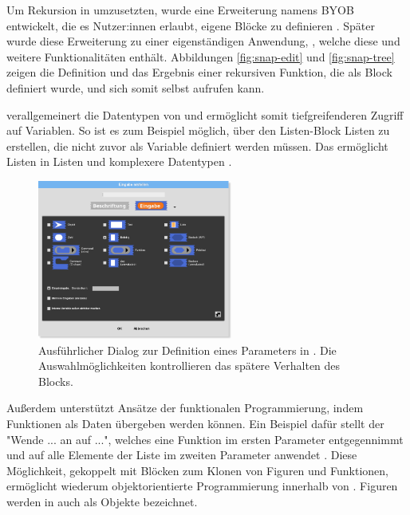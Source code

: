 Um Rekursion in \Scratch{} umzusetzten, wurde eine Erweiterung namens \ac{BYOB} entwickelt, die es Nutzer:innen erlaubt, eigene Blöcke zu definieren \parencite{harveyBringingNo2010}. Später wurde diese Erweiterung zu einer eigenständigen Anwendung, \Snap{}, welche diese und weitere Funktionalitäten enthält. Abbildungen \ref{fig:snap-edit} und \ref{fig:snap-tree} zeigen die Definition und das Ergebnis einer rekursiven Funktion, die als Block definiert wurde, und sich somit selbst aufrufen kann.

\Snap{} verallgemeinert die Datentypen von \Scratch{} und ermöglicht somit tiefgreifenderen Zugriff auf Variablen. So ist es zum Beispiel möglich, über den Listen-Block Listen zu erstellen, die nicht zuvor als Variable definiert werden müssen. Das ermöglicht Listen in Listen und komplexere Datentypen \parencite{harveySnapReference2020}.

\begin{figure}
  \centering
  \includegraphics[width=0.57\textwidth]{assets/snap-input-types.png}
  \caption[Dialog zur Definition eines Parameters in \Snap{}]{Ausführlicher Dialog zur Definition eines Parameters in \Snap{}. Die Auswahlmöglichkeiten kontrollieren das spätere Verhalten des Blocks.}
  \label{fig:snap-input-types}
\end{figure}

Außerdem unterstützt \Snap{} Ansätze der funktionalen Programmierung, indem Funktionen als Daten übergeben werden können. Ein Beispiel dafür stellt der "Wende ... an auf ...", welches eine Funktion im ersten Parameter entgegennimmt und auf alle Elemente der Liste im zweiten Parameter anwendet \parencite{harveySnapReference2020}. Diese Möglichkeit, gekoppelt mit Blöcken zum Klonen von Figuren und Funktionen, ermöglicht wiederum objektorientierte Programmierung innerhalb von \Snap{} \parencite{harveySnapReference2020}. Figuren werden in \Snap{} auch als Objekte bezeichnet.


